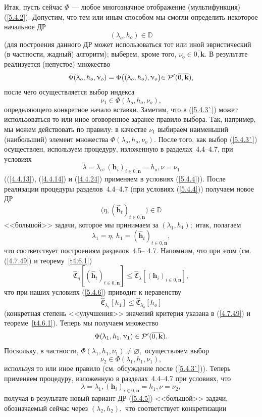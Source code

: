 \documentclass[11pt,twoside,openany]{report}
\newcommand{\bfn}{\begin{equation}}
\newcommand{\efn}{\end{equation}}
\newcommand{\ov}{\overline}
\newcommand{\la}{\lambda}
\newcommand{\cp}{{\cal P}}
\newcommand{\bbd}{{\mathbb D}}
\newcommand{\nn}{{\mathbf n}}
\newcommand{\emp}{\varnothing}
\begin{document}
{{Итак, пусть сейчас $\Phi$ --- любое многозначное отображение (мультифункция)
(\ref{5.4.2}). Допустим, что тем или иным способом мы смогли определить
некоторое начальное ДР
\bfn\label{5.4.3}
(\la_o,h_o)\in \bbd
\efn
(для построения данного ДР может использоваться тот или иной эвристический
(в частности, жадный) алгоритм); выберем, кроме того, $\nu_o\in \ov{0,\mathbf{k}}.$
В результате реализуется (непустое) множество
$$\Phi(\la_o,h_o,\nu_o) = \Phi\bigl((\la_o,h_o),\nu_o\bigl)\in
\cp^\prime(\ov{0,\mathbf{k}}),
$$
после чего  осуществляется выбор индекса
\bfn\label{5.4.3`}\nu_1\in \Phi(\la_o,h_o,\nu_o),
\efn
определяющего конкретное начало вставки. Заметим, что в (\ref{5.4.3`}) может
использоваться то или иное оговоренное заранее правило выбора. Так, например,
мы можем действовать по правилу: в качестве $\nu_1$ выбираем наименьший (наибольший)
элемент множества $\Phi(\la_o,h_o,\nu_o).$ После того, как выбор (\ref{5.4.3`})
осуществлен, используем процедуру, изложенную в разделах~4.4--4.7, при условиях
\bfn\label{5.4.4}\la = \la_o, (\mathbf{h}_i)_{i\in\ov{0,\nn}}= h_o, \nu = \nu_1
\efn
((\ref{4.4.13}), (\ref{4.4.14}) и (\ref{4.4.24}) применяем в условиях (\ref{5.4.4})).
После реализации процедуры разделов~4.4--4.7 (при условиях (\ref{5.4.4})) получаем
новое ДР
\bfn\label{5.4.5}\bigl(\eta,(\hat{\mathbf{h}}_t)_{t\in\ov{0,\nn}}\bigl)\in \bbd
\efn
<<большой>> задачи, которое мы принимаем за $(\la_1,h_1);$ итак, полагаем
\bfn\label{5.4.6}\la_1 = \eta,\,h_1 = (\hat{\mathbf{h}}_t)_{t\in\ov{0,\nn}},
\efn
что соответствует построениям разделов~4.5-- 4.7. Напомним, что при этом (см.
(\ref{4.7.49}) и теорему~\ref{t4.6.1})
$$
\widehat{\mathfrak{C}}_\eta[(\hat{\mathbf{h}}_t)_{t\in\ov{0,\nn}}] \leqslant
\widehat{\mathfrak{C}}_\la[(\mathbf{h}_i)_{i\in\ov{0,\nn}}],
$$
что при наших условиях (\ref{5.4.6}) приводит к неравенству
\bfn\label{5.4.7}\widehat{\mathfrak{C}}_{\la_1}[h_1] \leqslant
\widehat{\mathfrak{C}}_{\la_o}[h_o]
\efn
(конкретная степень <<улучшения>> значений критерия указана в (\ref{4.7.49})
и теореме~\ref{t4.6.1}). Теперь мы получаем множество
$$\Phi(\la_1,h_1,\nu_1) \in \cp^\prime(\ov{0,\mathbf{k}}).
$$
Поскольку, в частности, $\Phi(\la_1,h_1,\nu_1)\neq \emp,$ осуществляем выбор
\bfn\label{5.4.8}\nu_2\in \Phi(\la_1,h_1,\nu_1),
\efn
используя то или иное правило (см. обсуждение после (\ref{5.4.3`})). Теперь
применяем процедуру, изложенную в разделах~4.4--4.7 при условиях, что
$$\la =\la_1,(\mathbf{h}_i)_{i\in\ov{0,\nn}}= h_1, \nu= \nu_2,
$$
получая в результате новый вариант ДР (\ref{5.4.5}) <<большой>> задачи,
обозначаемый сейчас через $(\la_2,h_2),$ что соответствует конкретизации
}}
\end{document}
